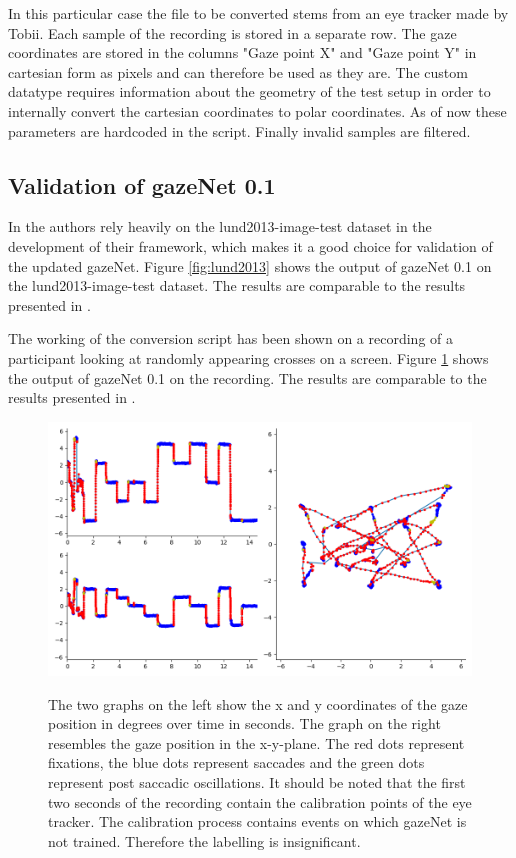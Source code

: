\documentclass[conference]{IEEEtran}
\begin{document}
In this particular case the file to be converted stems from an eye tracker made by Tobii. Each sample of the recording is stored in a separate row. The gaze coordinates are stored in the columns "Gaze point X" and "Gaze point Y" in cartesian form as pixels and can therefore be used as they are. The custom datatype requires information about the geometry of the test setup in order to internally convert the cartesian coordinates to polar coordinates. As of now these parameters are hardcoded in the script. Finally invalid samples are filtered.

\subsection{Validation of gazeNet 0.1}
In \citet{zemblys2018gazeNet} the authors rely heavily on the lund2013-image-test dataset in the development of their framework, which makes it a good choice for validation of the updated gazeNet. Figure \ref{fig:lund2013} shows the output of gazeNet 0.1 on the lund2013-image-test dataset. The results are comparable to the results presented in \citet{zemblys2018gazeNet}. 

The working of the conversion script has been shown on a recording of a participant looking at randomly appearing crosses on a screen. Figure \ref{fig:kreuze} shows the output of gazeNet 0.1 on the recording. The results are comparable to the results presented in \citet{zemblys2018gazeNet}.

\begin{figure}
    \includegraphics[width=\linewidth]{Kreuze_Random Recording1_short}
    \label{fig:kreuze}
    \caption{The two graphs on the left show the x and y coordinates of the gaze position in degrees over time in seconds. The graph on the right resembles the gaze position in the x-y-plane. The red dots represent fixations, the blue dots represent saccades and the green dots represent post saccadic oscillations. It should be noted that the first two seconds of the recording contain the calibration points of the eye tracker. The calibration process contains events on which gazeNet is not trained. Therefore the labelling is insignificant.}
\end{figure}
\end{document}
